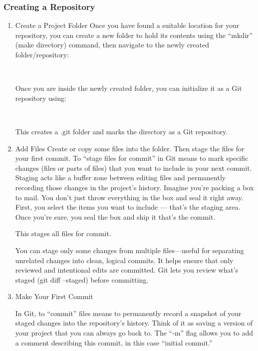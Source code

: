 \subsubsection{Creating a Repository}
\begin{enumerate}
\item Create a Project Folder
Once you have found a suitable location for your repository, you can create a new folder to hold its contents using the ``mkdir'' (make directory) command, then navigate to the newly created folder/repository:
\begin{terminal}
\\
\end{terminal}
Once you are inside the newly created folder, you can initialize it as a Git repository using:
\begin{terminal}
\\
\end{terminal}
This creates a .git folder and marks the directory as a Git repository.

\item Add Files
Create or copy some files into the folder. Then stage the files for your first commit. To ``stage files for commit'' in Git means to mark specific changes (files or parts of files) that you want to include in your next commit. Staging acts like a buffer zone between editing files and permanently recording those changes in the project’s history. Imagine you’re packing a box to mail. You don’t just throw everything in the box and seal it right away. First, you select the items you want to include --- that’s the staging area. Once you’re sure, you seal the box and ship it that’s the commit.
\begin{terminal}
\end{terminal}
This stages all files for commit.

You can stage only some changes from multiple files—useful for separating unrelated changes into clean, logical commits. It helps ensure that only reviewed and intentional edits are committed. Git lets you review what’s staged (git diff --staged) before committing.

\item Make Your First Commit
\begin{terminal}
\end{terminal}
In Git, to ``commit'' files means to permanently record a snapshot of your staged changes into the repository’s history. Think of it as saving a version of your project that you can always go back to.  The ``-m'' flag allows you to add a comment describing this commit, in this case ``initial commit.''


\end{enumerate}
